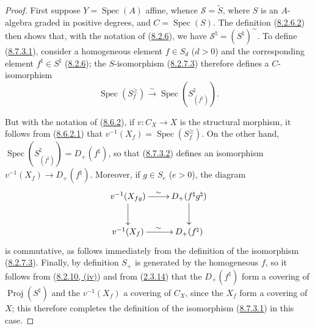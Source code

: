 \begin{proof}
First suppose $Y=\operatorname{Spec}(A)$ affine, whence
$\mathcal{S}=\widetilde{S}$, where $S$ is an $A$-algebra graded in positive
degrees, and $C=\operatorname{Spec}(S)$. The definition
(\hyperref[II.8.2.6.2]{8.2.6.2}) then shows that, with the notation of
(\hyperref[II.8.2.6]{8.2.6}), we have
$\mathcal{S}^{\natural}=(S^{\natural})^{\sim}$. To define
(\hyperref[II.8.7.3.1]{8.7.3.1}), consider a homogeneous element
$f\in S_d$ ($d>0$) and the corresponding element $f^{\natural}\in S^{\natural}$
(\hyperref[II.8.2.6]{8.2.6}); the $S$-isomorphism
(\hyperref[II.8.2.7.3]{8.2.7.3}) therefore defines a $C$-isomorphism
\begin{equation}
\label{II.8.7.3.2}
  \operatorname{Spec}(S_f^{\geqslant})
  \xrightarrow{\sim}
  \operatorname{Spec}(S_{(f^{\natural})}^{\natural}).
\tag{8.7.3.2}
\end{equation}

But with the notation of (\hyperref[II.8.6.2]{8.6.2}), if
$v:C_X\to X$ is the structural morphism, it follows from
(\hyperref[II.8.6.2.1]{8.6.2.1}) that
$v^{-1}(X_f)=\operatorname{Spec}(S_f^{\geqslant})$. On the other hand,
$\operatorname{Spec}(S_{(f^{\natural})}^{\natural})=D_+(f^{\natural})$, so
that (\hyperref[II.8.7.3.2]{8.7.3.2}) defines an isomorphism
$v^{-1}(X_f)\to D_+(f^{\natural})$. Moreover, if $g\in S_e$ ($e>0$), the
diagram
\[
  \xymatrix{
    v^{-1}(X_{fg})\ar[r]^{\sim}\ar[d] &
    D_+(f^{\natural}g^{\natural})\ar[d]\\
    v^{-1}(X_f)\ar[r]^{\sim} & D_+(f^{\natural})
  }
\]
is commutative, as follows immediately from the definition of the isomorphism
(\hyperref[II.8.2.7.3]{8.2.7.3}). Finally, by definition $S_+$ is generated
by the homogeneous $f$, so it follows from
(\hyperref[II.8.2.10]{8.2.10, (iv)}) and from
(\hyperref[II.2.3.14]{2.3.14}) that the $D_+(f^{\natural})$ form a
covering of $\operatorname{Proj}(S^{\natural})$ and the $v^{-1}(X_f)$ a
covering of $C_X$, since the $X_f$ form a covering of $X$; this therefore
completes the definition of the isomorphism
(\hyperref[II.8.7.3.1]{8.7.3.1}) in this case.


\end{proof}

